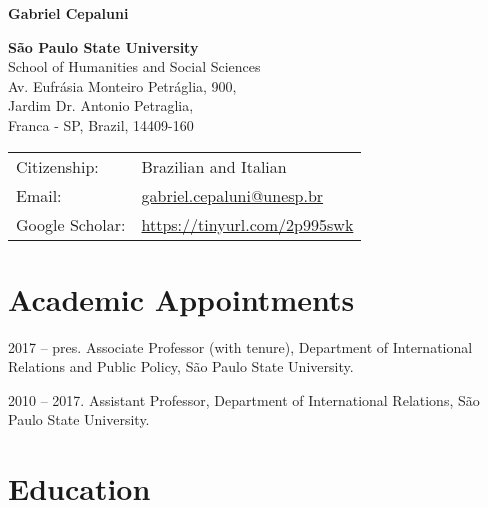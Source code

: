 \documentclass[a4paper,11.5pt]{article}
\def\name{Gabriel Cepaluni}
\renewenvironment{itemize}{
	\begin{list}{}{
			\setlength{\leftmargin}{1.5em}
		}
		}{
	\end{list}
}
\begin{document}
\sloppy

{\huge \bf \name}


\vspace{0.25in}

\begin{minipage}{0.45\linewidth}
	\textbf{São Paulo State University}\\
	School of Humanities and Social Sciences\\
  Av. Eufrásia Monteiro Petráglia, 900, \\
	Jardim Dr. Antonio Petraglia, \\
	Franca - SP, Brazil, 14409-160
\end{minipage}
\begin{minipage}{0.45\linewidth}
	\begin{tabular}{ll}
	Citizenship:   &   Brazilian and Italian          \\
		Email:          & \href{mailto:gabriel.cepaluni@unesp.br}{gabriel.cepaluni@unesp.br}            \\
    Google Scholar: & \href{https://tinyurl.com/2p995swk}{https://tinyurl.com/2p995swk} %
	\end{tabular}
	\end{minipage}

\section*{Academic Appointments}

\begin{itemize}
	\item 2017 -- pres. Associate Professor (with tenure), Department of International Relations and Public Policy, São Paulo State University.
	\item 2010 -- 2017. Assistant Professor, Department of International Relations, São Paulo State University.
\end{itemize}

\section*{Education}
\end{document}
